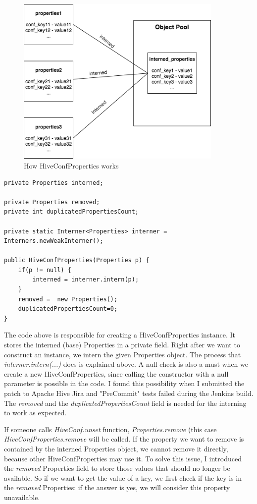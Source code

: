  \begin{figure}[H]
 	\includegraphics[width=100mm,keepaspectratio]{figures/hiveconf_solution.png}
 	\centering
 	\caption{How HiveConfProperties works}
 \end{figure}

\begin{lstlisting}
private Properties interned;

private Properties removed;
private int duplicatedPropertiesCount;

private static Interner<Properties> interner = Interners.newWeakInterner();

public HiveConfProperties(Properties p) {
	if(p != null) {
		interned = interner.intern(p);
	}
	removed =  new Properties();
	duplicatedPropertiesCount=0;
}
\end{lstlisting}

The code above is responsible for creating a HiveConfProperties instance. It stores the interned (base) Properties in a private field. Right after we want to construct an instance, we intern the given Properties object. The process that \textit{interner.intern(...)} does is explained above. A null check is also a must when we create a new HiveConfProperties, since calling the constructor with a null parameter is possible in the code. I found this possibility when I submitted the patch to Apache Hive Jira and "PreCommit" tests failed during the Jenkins build. The \textit{removed} and the \textit{duplicatedPropertiesCount} field is needed for the interning to work as expected. 

If someone calls \textit{HiveConf.unset} function, \textit{Properties.remove} (this case \textit{HiveConfProperties.remove} will be called. If the property we want to remove is contained by the interned Properties object, we cannot remove it directly, because other HiveConfProperties may use it. To solve this issue, I introduced the \textit{removed} Properties field to store those values that should no longer be available. So if we want to get the value of a key, we first check if the key is in the \textit{removed} Properties: if the answer is yes, we will consider this property unavailable.

